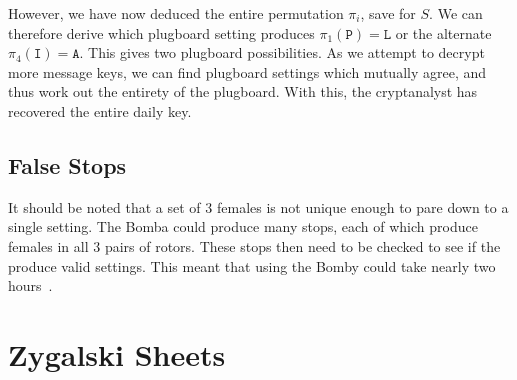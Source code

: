 \noindent However, we have now deduced the entire permutation
$\pi_i$, save for $S$. We can therefore derive which plugboard
setting produces $\pi_1(\texttt{P}) = \texttt{L}$ or the
alternate $\pi_4(\texttt{I}) = \texttt{A}$. This gives two
plugboard possibilities. As we attempt to decrypt more message keys,
we can find plugboard settings which mutually agree, and thus work out the
entirety of the plugboard. With this, the cryptanalyst has recovered
the entire daily key.
\subsection{False Stops}
It should be noted that a set of $3$ females is not unique enough to
pare down to a single setting. The Bomba could produce many stops,
each of which produce females in all $3$ pairs of rotors. These stops
then need to be checked to see if the produce valid settings. This
meant that using the Bomby could take nearly two hours~\cite[p.~242]{KozaczukEnigma1984}.

\section{Zygalski Sheets}\label{zygalski}

